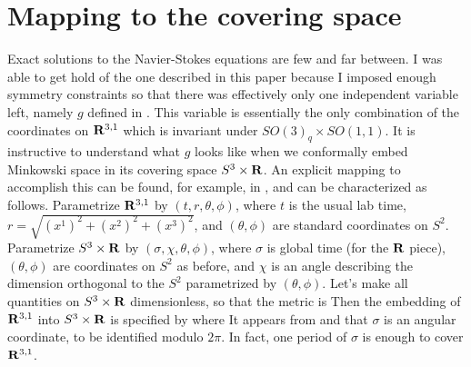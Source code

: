 \documentclass[12pt]{article}
\begin{document}
\section{Mapping to the covering space}
\label{COVERING}

Exact solutions to the Navier-Stokes equations are few and far between.  I was able to get hold of the one described in this paper because I imposed enough symmetry constraints so that there was effectively only one independent variable left, namely $g$ defined in .  This variable is essentially the only combination of the coordinates on ${\bf R}^{3,1}$ which is invariant under $SO(3)_q \times SO(1,1)$.  It is instructive to understand what $g$ looks like when we conformally embed Minkowski space in its covering space $S^3 \times {\bf R}$.  An explicit mapping to accomplish this can be found, for example, in \cite{Friess:2006kw}, and can be characterized as follows.  Parametrize ${\bf R}^{3,1}$ by $(t,r,\theta,\phi)$, where $t$ is the usual lab time, $r = \sqrt{(x^1)^2 + (x^2)^2 + (x^3)^2}$, and $(\theta,\phi)$ are standard coordinates on $S^2$.  Parametrize $S^3 \times {\bf R}$ by $(\sigma,\chi,\theta,\phi)$, where $\sigma$ is global time (for the ${\bf R}$ piece), $(\theta,\phi)$ are coordinates on $S^2$ as before, and $\chi$ is an angle describing the dimension orthogonal to the $S^2$ parametrized by $(\theta,\phi)$.  Let's make all quantities on $S^3 \times {\bf R}$ dimensionless, so that the metric is
Then the embedding of ${\bf R}^{3,1}$ into $S^3 \times {\bf R}$ is specified by
where
It appears from  and  that $\sigma$ is an angular coordinate, to be identified modulo $2\pi$.  In fact, one period of $\sigma$ is enough to cover ${\bf R}^{3,1}$.
\end{document}
